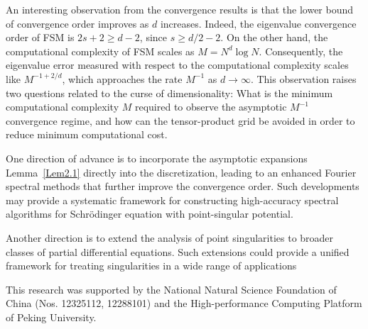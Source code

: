 \documentclass{sn-jnl}%
\numberwithin{equation}{section}
\theoremstyle{thmstyleone}%
\theoremstyle{thmstyletwo}%
\theoremstyle{thmstylethree}%
\begin{document}
An interesting observation from the convergence results is that the lower bound of convergence order improves as $d$ increases. Indeed, the eigenvalue convergence order of FSM is $2s+2 \ge d-2$, since $s \ge d/2-2$. On the other hand, the computational complexity of FSM scales as $M = N^d \log N$. Consequently, the eigenvalue error measured with respect to the computational complexity scales like $ M^{-1+2/d}$,
which approaches the rate $M^{-1}$ as $d\to\infty$.
This observation raises two questions related to the curse of dimensionality: What is the minimum computational complexity $M$ required to observe the asymptotic $M^{-1}$ convergence regime, and how can the tensor-product grid be avoided in order to reduce minimum computational cost.

One direction of advance is to incorporate the asymptotic expansions Lemma~\ref{Lem2.1} directly into the discretization, leading to an enhanced Fourier spectral methods that further improve the convergence order. 
Such developments may provide a systematic framework for constructing high-accuracy spectral algorithms for Schr\"odinger equation with point-singular potential. 

Another direction is to extend the analysis of point singularities to broader classes of partial differential equations. Such extensions could provide a unified framework for treating singularities in a wide range of applications



This research was supported by the National Natural Science Foundation of China (Nos. 12325112, 12288101) and  the High-performance Computing Platform of Peking University.
\end{document}
